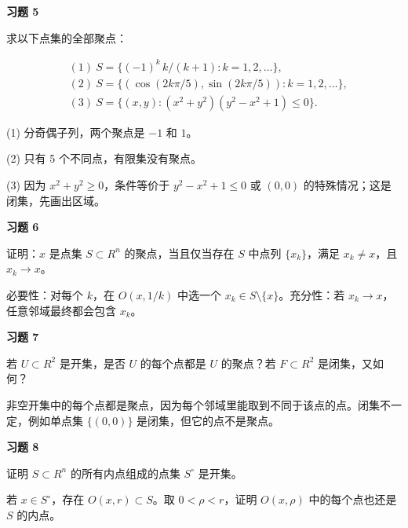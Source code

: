 \begin{exercisebox}
\textbf{习题 5}

求以下点集的全部聚点：

\[
        \begin{aligned}
        &(1)\ S=\{(-1)^k\,k/(k+1):k=1,2,\ldots\},\\
        &(2)\ S=\{(\cos(2k\pi/5),\sin(2k\pi/5)):k=1,2,\ldots\},\\
        &(3)\ S=\{(x,y):(x^2+y^2)(y^2-x^2+1)\le0\}.
        \end{aligned}
      \]

\begin{hintbox}
(1) 分奇偶子列，两个聚点是 \(-1\) 和 \(1\)。

(2) 只有 5 个不同点，有限集没有聚点。

(3) 因为 \(x^2+y^2\ge0\)，条件等价于 \(y^2-x^2+1\le0\) 或 \((0,0)\) 的特殊情况；这是闭集，先画出区域。
\end{hintbox}
\end{exercisebox}

\begin{exercisebox}
\textbf{习题 6}

证明：\(x\) 是点集 \(S\subset R^n\) 的聚点，当且仅当存在 \(S\) 中点列 \(\{x_k\}\)，满足 \(x_k\ne x\)，且 \(x_k\to x\)。

\begin{hintbox}
必要性：对每个 \(k\)，在 \(O(x,1/k)\) 中选一个 \(x_k\in S\setminus\{x\}\)。充分性：若 \(x_k\to x\)，任意邻域最终都会包含 \(x_k\)。
\end{hintbox}
\end{exercisebox}

\begin{exercisebox}
\textbf{习题 7}

若 \(U\subset R^2\) 是开集，是否 \(U\) 的每个点都是 \(U\) 的聚点？若 \(F\subset R^2\) 是闭集，又如何？

\begin{hintbox}
非空开集中的每个点都是聚点，因为每个邻域里能取到不同于该点的点。闭集不一定，例如单点集 \(\{(0,0)\}\) 是闭集，但它的点不是聚点。
\end{hintbox}
\end{exercisebox}

\begin{exercisebox}
\textbf{习题 8}

证明 \(S\subset R^n\) 的所有内点组成的点集 \(S^\circ\) 是开集。

\begin{hintbox}
若 \(x\in S^\circ\)，存在 \(O(x,r)\subset S\)。取 \(0<\rho<r\)，证明 \(O(x,\rho)\) 中的每个点也还是 \(S\) 的内点。
\end{hintbox}
\end{exercisebox}

